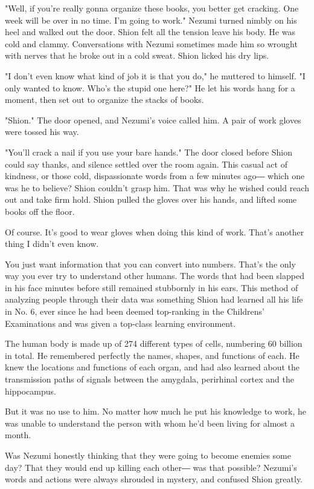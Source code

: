 "Well, if you're really gonna organize these books, you better get
cracking. One week will be over in no time. I'm going to work." Nezumi
turned nimbly on his heel and walked out the door. Shion felt all the
tension leave his body. He was cold and clammy. Conversations with
Nezumi sometimes made him so wrought with nerves that he broke out in a
cold sweat. Shion licked his dry lips.

"I don't even know what kind of job it is that you do," he muttered to
himself. "I only wanted to know. Who's the stupid one here?" He let his
words hang for a moment, then set out to organize the stacks of books.

"Shion." The door opened, and Nezumi's voice called him. A pair of work
gloves were tossed his way.

"You'll crack a nail if you use your bare hands." The door closed before
Shion could say thanks, and silence settled over the room again. This
casual act of kindness, or those cold, dispassionate words from a few
minutes ago― which one was he to believe? Shion couldn't grasp him. That
was why he wished could reach out and take firm hold. Shion pulled the
gloves over his hands, and lifted some books off the floor.

Of course. It's good to wear gloves when doing this kind of work. That's
another thing I didn't even know.

You just want information that you can convert into numbers. That's the
only way you ever try to understand other humans. The words that had
been slapped in his face minutes before still remained stubbornly in his
ears. This method of analyzing people through their data was something
Shion had learned all his life in No. 6, ever since he had been deemed
top-ranking in the Childrens' Examinations and was given a top-class
learning environment.

The human body is made up of 274 different types of cells, numbering 60
billion in total. He remembered perfectly the names, shapes, and
functions of each. He knew the locations and functions of each organ,
and had also learned about the transmission paths of signals between the
amygdala, perirhinal cortex and the hippocampus.

But it was no use to him. No matter how much he put his knowledge to
work, he was unable to understand the person with whom he'd been living
for almost a month.

Was Nezumi honestly thinking that they were going to become enemies some
day? That they would end up killing each other― was that possible?
Nezumi's words and actions were always shrouded in mystery, and confused
Shion greatly.

